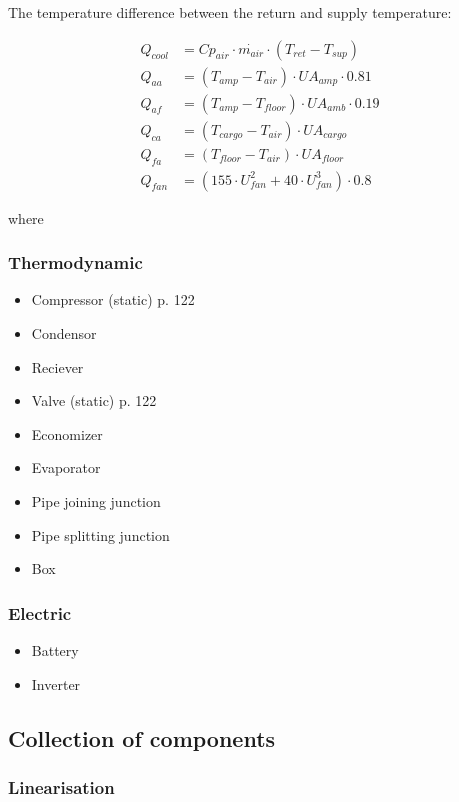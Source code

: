 The temperature difference between the return and supply temperature:

\begin{align}
	Q_{cool} & = Cp_{air} \cdot \dot{m_{air}} \cdot (T_{ret} - T_{sup})\\
	Q_{aa} & = (T_{amp} - T_{air}) \cdot U A_{amp} \cdot 0.81\\
	Q_{af} & = (T_{amp} - T_{floor}) \cdot U A_{amb} \cdot 0.19\\
	Q_{ca} & = (T_{cargo} - T_{air}) \cdot U A_{cargo}\\
	Q_{fa} & = (T_{floor} - T_{air}) \cdot U A_{floor}\\
	Q_{fan} & = (155 \cdot U_{fan}^2 + 40 \cdot U_{fan}^3) \cdot 0.8
\end{align}

where


\subsubsection{Thermodynamic}

\begin{itemize}
	\item Compressor (static) \cite{Sorensen2013} p. 122
	\item Condensor
	\item Reciever
	\item Valve (static) \cite{Sorensen2013} p. 122
	\item Economizer
	\item Evaporator
	\item Pipe joining junction
	\item Pipe splitting junction
	\item Box
\end{itemize}

\subsubsection{Electric}

\begin{itemize}
	\item Battery
	\item Inverter
\end{itemize}

\subsection{Collection of components}

\subsubsection{Linearisation}